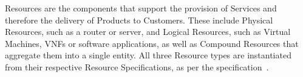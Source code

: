


Resources are the components that support the provision of Services and therefore the delivery of Products to Customers. These include Physical Resources, such as a router or server, and Logical Resources, such as Virtual Machines, \acp{VNF} or software applications, as well as Compound Resources that aggregate them into a single entity. All three Resource types are instantiated from their respective Resource Specifications, as per the specification~\cite{SID-MODELS-v250-TMF}.

